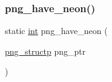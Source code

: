 \subsubsection{\texorpdfstring{png\+\_\+have\+\_\+neon()}{png\_have\_neon()}}
{\footnotesize\ttfamily static \mbox{\hyperlink{ioapi_8h_a787fa3cf048117ba7123753c1e74fcd6}{int}} png\+\_\+have\+\_\+neon (\begin{DoxyParamCaption}\item[{\mbox{\hyperlink{png_8h_a05b958915368d6bbd797ef70f24b9ff6}{png\+\_\+structp}}}]{png\+\_\+ptr }\end{DoxyParamCaption})\hspace{0.3cm}{\ttfamily [static]}}

